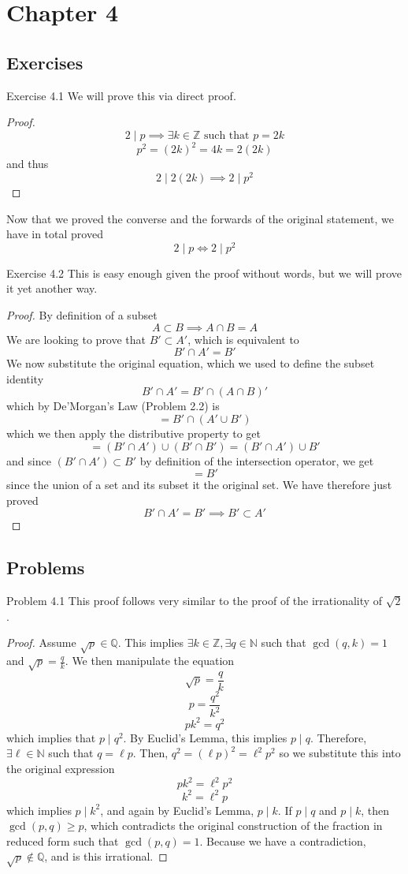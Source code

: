 \section{Chapter 4}
\subsection{Exercises} %
\begin{sol}{Exercise 4.1}
We will prove this via direct proof.
\begin{proof}
\[
2 \mid p \implies \exists k \in \mathbb{Z} \text{ such that } p = 2k
\]
\[
p^2 = (2k)^2 = 4k = 2(2k)
\]
and thus
\[
2 \mid 2(2k) \implies 2 \mid p^2
\]
\end{proof}
Now that we proved the converse and the forwards of the original statement, we have in total proved
\[
2 \mid p \iff 2 \mid p^2
\]
\end{sol}
\begin{sol}{Exercise 4.2}
This is easy enough given the proof without words, but we will prove it yet another way. 
\begin{proof}
By definition of a subset
\[
A \subset B \implies A \cap B = A
\]
We are looking to prove that $B' \subset A'$, which is equivalent to
\[
B' \cap A' = B'
\]
We now substitute the original equation, which we used to define the subset identity
\[
B' \cap A' = B' \cap (A \cap B)'
\]
which by De'Morgan's Law (Problem 2.2) is 
\[
= B' \cap (A' \cup B')
\]
which we then apply the distributive property to get
\[
= (B' \cap A') \cup(B' \cap B') = (B' \cap A') \cup B'
\]
and since $(B' \cap A') \subset B'$ by definition of the intersection operator, we get 
\[
= B'
\]
since the union of a set and its subset it the original set. We have therefore just proved
\[
B' \cap A' = B' \implies B' \subset A'
\]
\end{proof}
\end{sol}


\subsection{Problems} %
\begin{sol}{Problem 4.1}
This proof follows very similar to the proof of the irrationality of $\sqrt{2}$.
\begin{proof}
Assume $\sqrt{p} \in \mathbb{Q}$. This implies $\exists k \in \mathbb{Z}, \exists q \in \mathbb{N}$ such that $\gcd(q, k) = 1$ and $\sqrt{p} = \frac{q}{k}$. We then manipulate the equation
\[
\sqrt{p} = \frac{q}{k}
\]
\[
p = \frac{q^2}{k^2}
\]
\[
pk^2 = q^2
\]
which implies that $p \mid q^2$. By Euclid's Lemma, this implies $p \mid q$. Therefore, $\exists \ell \in \mathbb{N}$ such that $q = \ell p$. Then, $q^2 = (\ell p)^2 = \ell^2p^2$ so we substitute this into the original expression
\[
pk^2 = \ell^2 p^2
\]
\[
k^2 = \ell^2 p
\]
which implies $p \mid k^2$, and again by Euclid's Lemma, $p \mid k$. If $p \mid q$ and $p \mid k$, then $\gcd(p, q) \geq p$, which contradicts the original construction of the fraction in reduced form such that $\gcd(p, q) = 1$. Because we have a contradiction, $\sqrt{p} \not\in \mathbb{Q}$, and is this irrational.
\end{proof}
\end{sol}

